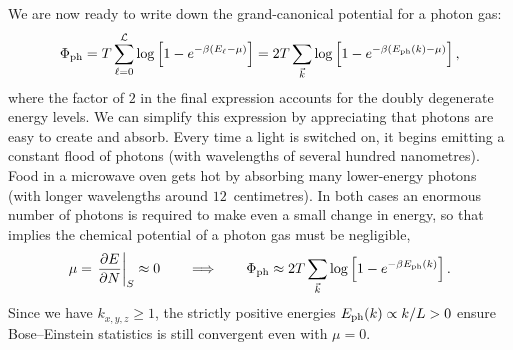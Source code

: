 We are now ready to write down the grand-canonical potential for a photon gas:
\begin{equation*}
  \Phi_{\text{ph}} = T \sum_{\ell = 0}^{\mathcal L} \log\left[1 - e^{-\beta (E_{\ell} - \mu)}\right] = 2T \sum_{\vec k} \log\left[1 - e^{-\beta (E_{\text{ph}}(k) - \mu)}\right],
\end{equation*}
where the factor of $2$ in the final expression accounts for the doubly degenerate energy levels.
We can simplify this expression by appreciating that photons are easy to create and absorb.
Every time a light is switched on, it begins emitting a constant flood of photons (with wavelengths of several hundred nanometres).
Food in a microwave oven gets hot by absorbing many lower-energy photons (with longer wavelengths around $12$~centimetres).
In both cases an enormous number of photons is required to make even a small change in energy, so that  implies the chemical potential of a photon gas must be negligible,
\begin{equation*}
  \mu = \left.\frac{\partial E}{\partial N}\right|_S \approx 0 \qquad \Longrightarrow \qquad \Phi_{\text{ph}} \approx 2T \sum_{\vec k} \log\left[1 - e^{-\beta E_{\text{ph}}(k)}\right].
\end{equation*}
Since we have $k_{x, y, z} \geq 1$, the strictly positive energies $E_{\text{ph}}(k) \propto k / L > 0$ ensure Bose--Einstein statistics is still convergent even with $\mu = 0$.

